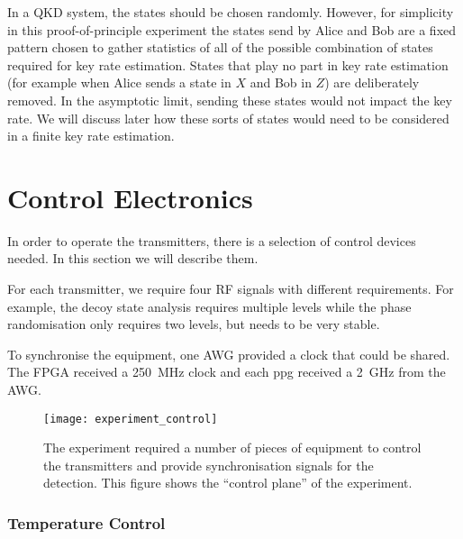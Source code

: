 In a \ac{QKD} system, the states should be chosen randomly. However, for simplicity in this proof-of-principle experiment the states send by Alice and Bob are a fixed pattern chosen to gather statistics of all of the possible combination of states required for key rate estimation. States that play no part in key rate estimation (for example when Alice sends a state in $X$ and Bob in $Z$) are deliberately removed. In the asymptotic limit, sending these states would not impact the key rate. We will discuss later how these sorts of states would need to be considered in a finite key rate estimation.

\section{Control Electronics}

In order to operate the transmitters, there is a selection of control devices needed. In this section we will describe them.

For each transmitter, we require four RF signals with different requirements. For example, the decoy state analysis requires multiple levels while the phase randomisation only requires two levels, but needs to be very stable.

To synchronise the equipment, one AWG provided a clock that could be shared. The FPGA received a \SI{250}{\MHz} clock and each \ac{ppg} received a \SI{2}{\GHz} from the AWG. 

\begin{figure}[tbp]
	\centering
	\texttt{[image: experiment\_control]}
	\caption[Control electronic schematic of the MDI-QKD experiment]{The experiment required a number of pieces of equipment to control the transmitters and provide synchronisation signals for the detection. This figure shows the ``control plane'' of the experiment.}
	\label{fig04:exp_control}
\end{figure}

\subsubsection*{Temperature Control}

